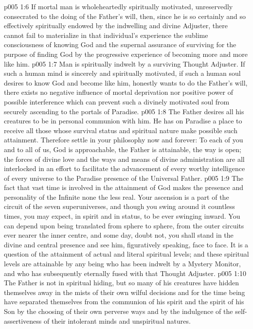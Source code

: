 \vs p005 1:6 \pc If mortal man is wholeheartedly spiritually motivated, unreservedly consecrated to the doing of the Father’s will, then, since he is so certainly and so effectively spiritually endowed by the indwelling and divine Adjuster, there cannot fail to materialize in that individual’s experience the sublime consciousness of knowing God and the supernal assurance of surviving for the purpose of finding God by the progressive experience of becoming more and more like him.
\vs p005 1:7 Man is spiritually indwelt by a surviving Thought Adjuster. If such a human mind is sincerely and spiritually motivated, if such a human soul desires to know God and become like him, honestly wants to do the Father’s will, there exists no negative influence of mortal deprivation nor positive power of possible interference which can prevent such a divinely motivated soul from securely ascending to the portals of Paradise.
\vs p005 1:8 The Father desires all his creatures to be in personal communion with him. He has on Paradise a place to receive all those whose survival status and spiritual nature make possible such attainment. Therefore settle in your philosophy now and forever: To each of you and to all of us, God is approachable, the Father is attainable, the way is open; the forces of divine love and the ways and means of divine administration are all interlocked in an effort to facilitate the advancement of every worthy intelligence of every universe to the Paradise presence of the Universal Father.
\vs p005 1:9 The fact that vast time is involved in the attainment of God makes the presence and personality of the Infinite none the less real. Your ascension is a part of the circuit of the seven superuniverses, and though you swing around it countless times, you may expect, in spirit and in status, to be ever swinging inward. You can depend upon being translated from sphere to sphere, from the outer circuits ever nearer the inner centre, and some day, doubt not, you shall stand in the divine and central presence and see him, figuratively speaking, face to face. It is a question of the attainment of actual and literal spiritual levels; and these spiritual levels are attainable by any being who has been indwelt by a Mystery Monitor, and who has subsequently eternally fused with that Thought Adjuster.
\vs p005 1:10 \pc The Father is not in spiritual hiding, but so many of his creatures have hidden themselves away in the mists of their own wilful decisions and for the time being have separated themselves from the communion of his spirit and the spirit of his Son by the choosing of their own perverse ways and by the indulgence of the self\hyp{}assertiveness of their intolerant minds and unspiritual natures.
